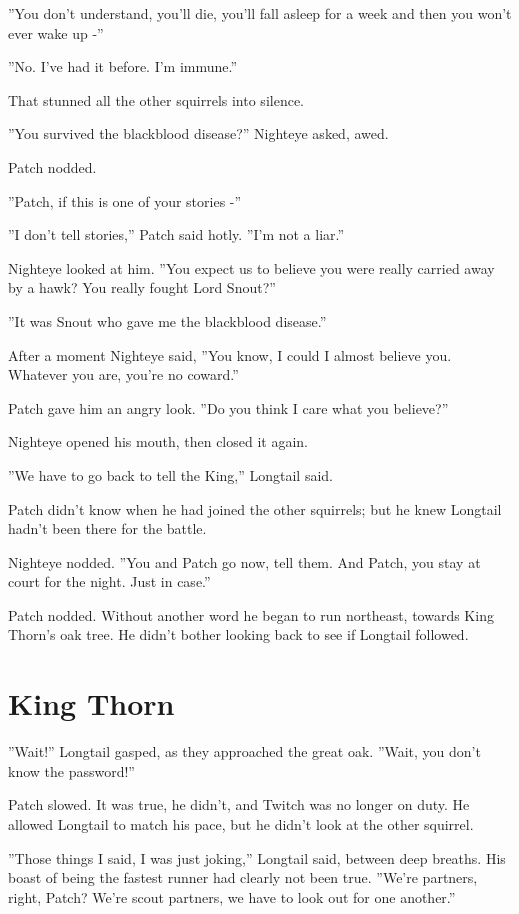 \documentclass[12pt]{book}
\begin{document}
''You don't understand, you'll die, you'll fall asleep for a week and then you won't ever wake up -''

''No. I've had it before. I'm immune.''

That stunned all the other squirrels into silence.

''You survived the blackblood disease?'' Nighteye asked, awed.

Patch nodded.

''Patch, if this is one of your stories -''

''I don't tell stories,'' Patch said hotly. ''I'm not a liar.''

Nighteye looked at him. ''You expect us to believe you were really carried away by a hawk? You really fought Lord Snout?''

''It was Snout who gave me the blackblood disease.''

After a moment Nighteye said, ''You know, I could I almost believe you. Whatever you are, you're no coward.''

Patch gave him an angry look. ''Do you think I care what you believe?''

Nighteye opened his mouth, then closed it again.

''We have to go back to tell the King,'' Longtail said.

Patch didn't know when he had joined the other squirrels; but he knew Longtail hadn't been there for the battle.

Nighteye nodded. ''You and Patch go now, tell them. And Patch, you stay at court for the night. Just in case.''

Patch nodded. Without another word he began to run northeast, towards King Thorn's oak tree. He didn't bother looking back to see if Longtail followed.


\section{King Thorn}

''Wait!'' Longtail gasped, as they approached the great oak. ''Wait, you don't know the password!''

Patch slowed. It was true, he didn't, and Twitch was no longer on duty. He allowed Longtail to match his pace, but he didn't look at the other squirrel.

''Those things I said, I was just joking,'' Longtail said, between deep breaths. His boast of being the fastest runner had clearly not been true. ''We're partners, right, Patch? We're scout partners, we have to look out for one another.''
\end{document}
